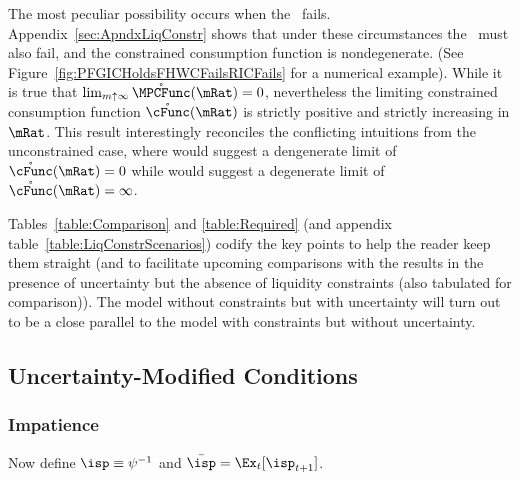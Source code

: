 \documentclass[BufferStockTheory]{subfiles}
\begin{document}
\hypertarget{RICandFHWCFail}{}
The most peculiar possibility occurs when the \RIC~fails.  Appendix~\ref{sec:ApndxLiqConstr} shows that under these circumstances the \FHWC~must also fail, and the constrained consumption function is nondegenerate.  (See Figure~\ref{fig:PFGICHoldsFHWCFailsRICFails} for a numerical example).  While it is true that $\lim_{m \uparrow \infty}
\mathring{\MPCFunc}(\mRat) = 0$, nevertheless the limiting constrained
consumption function $\mathring{\cFunc}(\mRat)$ is strictly positive
and strictly increasing in $\mRat$.  This result interestingly
reconciles the conflicting intuitions from the unconstrained case,
where \cncl{\RIC} would suggest a dengenerate limit of
$\mathring{\cFunc}(\mRat)=0$ while \cncl{\FHWC} would suggest a
degenerate limit of $\mathring{\cFunc}(\mRat)=\infty$.

Tables~\ref{table:Comparison} and \ref{table:Required} (and appendix
table~\ref{table:LiqConstrScenarios}) codify the key points to help
the reader keep them straight (and to facilitate upcoming comparisons
with the results in the presence of uncertainty
but the absence of liquidity constraints (also tabulated for comparison)).  The model without constraints but with uncertainty will turn out to be a close parallel to the model with constraints but without uncertainty.

\hypertarget{Uncertainty-Modified-Conditions}{}
\subsection{Uncertainty-Modified Conditions}
\subsubsection{Impatience}



Now define $\isp \equiv \psi^{-1}$ and $\bar{\isp} = \Ex_{t}[\isp_{t+1}]$.  %
\end{document}
